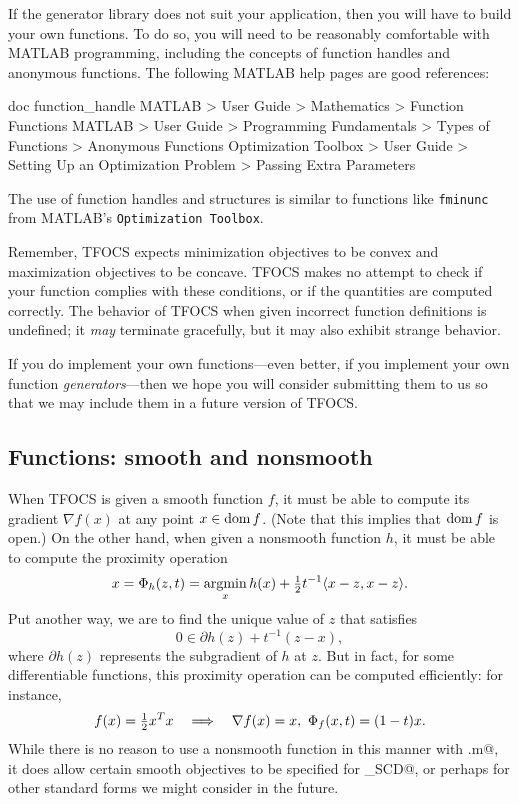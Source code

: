 \documentclass{article}
\begin{document}
If the generator library does not suit your application, then you
will have to build your own functions. To do so, you 
will need to be reasonably comfortable with MATLAB programming, 
including the concepts of function handles and anonymous functions.
The following MATLAB help pages are good references:
\begin{code}
	doc function_handle
	MATLAB > User Guide > Mathematics > Function Functions
	MATLAB > User Guide > Programming Fundamentals > Types of Functions 
	       > Anonymous Functions
	Optimization Toolbox > User Guide > Setting Up an Optimization Problem 
	       > Passing Extra Parameters
\end{code}
The use of function handles
and structures is similar to functions like {\tt fminunc}
from MATLAB's {\tt Optimization Toolbox}.

Remember, TFOCS expects minimization objectives to be convex
and maximization objectives to be concave. 
TFOCS makes no attempt to check if your function complies with
these conditions, or if the quantities are computed correctly.
The behavior of TFOCS when given incorrect function definitions
is undefined; it  \emph{may} terminate gracefully, but it 
may also exhibit strange behavior.

If you do implement your own functions---even better,
if you implement your own function \emph{generators}---then we hope
you will consider submitting them to us so that we may include
them in a future version of TFOCS.

\subsection{Functions: smooth and nonsmooth}
\label{sec:smoothandnon}

When TFOCS is given a smooth function $f$, it must be able
to compute its gradient $\nabla f(x)$ at any point $x\in\operatorname{\textrm{dom}} f$.
(Note that this implies that $\operatorname{\textrm{dom}} f$ is open.) On the other hand,
when given a nonsmooth function $h$, it must 
be able to compute the proximity operation
\begin{equation}
	\label{eq:proxminf}
	x = \Phi_h(z,t) = \operatorname*{argmin}_x h(x) + {\textstyle\frac{1}{2}} t^{-1} \langle x - z, x - z \rangle.
\end{equation}
Put another way, we are to find the unique value of $z$ that satisfies
\begin{equation}
	0 \in \partial h(z) + t^{-1} ( z - x ),
\end{equation}
where $\partial h(z)$ represents the subgradient of $h$ at $z$.
But in fact, for some differentiable functions, this proximity operation
can be computed efficiently: for instance,
\begin{equation}
	f(x)={\textstyle\frac{1}{2}} x^Tx \quad\Longrightarrow\quad 
	\nabla f(x)=x, ~ \Phi_f(x,t)=(1-t)x.
\end{equation}
While there is no reason to use a nonsmooth function in this manner
with \verb@tfocs.m@, it does allow certain smooth objectives to be
specified for \verb@tfocs_SCD@, or perhaps for other standard forms
we might consider in the future. 
\end{document}
